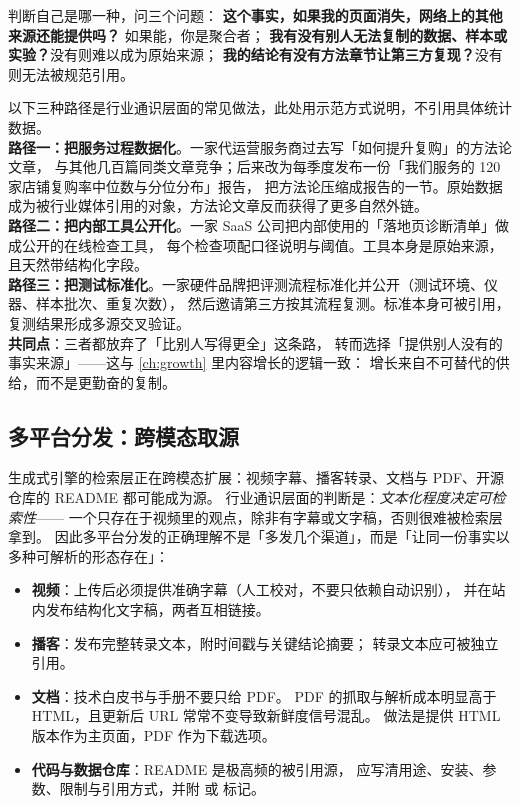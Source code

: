 判断自己是哪一种，问三个问题：
\textbf{这个事实，如果我的页面消失，网络上的其他来源还能提供吗？}
如果能，你是聚合者；
\textbf{我有没有别人无法复制的数据、样本或实验？}没有则难以成为原始来源；
\textbf{我的结论有没有方法章节让第三方复现？}没有则无法被规范引用。

\begin{casebox}[案例：从聚合者转为原始来源的三种路径（示范）]
以下三种路径是行业通识层面的常见做法，此处用示范方式说明，不引用具体统计数据。\\
\textbf{路径一：把服务过程数据化}。一家代运营服务商过去写「如何提升复购」的方法论文章，
与其他几百篇同类文章竞争；后来改为每季度发布一份「我们服务的 120 家店铺复购率中位数与分位分布」报告，
把方法论压缩成报告的一节。原始数据成为被行业媒体引用的对象，方法论文章反而获得了更多自然外链。\\
\textbf{路径二：把内部工具公开化}。一家 SaaS 公司把内部使用的「落地页诊断清单」做成公开的在线检查工具，
每个检查项配口径说明与阈值。工具本身是原始来源，且天然带结构化字段。\\
\textbf{路径三：把测试标准化}。一家硬件品牌把评测流程标准化并公开（测试环境、仪器、样本批次、重复次数），
然后邀请第三方按其流程复测。标准本身可被引用，复测结果形成多源交叉验证。\\
\textbf{共同点}：三者都放弃了「比别人写得更全」这条路，
转而选择「提供别人没有的事实来源」——这与 \cref{ch:growth} 里内容增长的逻辑一致：
增长来自不可替代的供给，而不是更勤奋的复制。
\end{casebox}

\subsection{多平台分发：跨模态取源}

生成式引擎的检索层正在跨模态扩展：视频字幕、播客转录、文档与 PDF、开源仓库的 README 都可能成为源。
行业通识层面的判断是：\emph{文本化程度决定可检索性}——
一个只存在于视频里的观点，除非有字幕或文字稿，否则很难被检索层拿到。
因此多平台分发的正确理解不是「多发几个渠道」，而是「让同一份事实以多种可解析的形态存在」：

\begin{itemize}
  \item \textbf{视频}：上传后必须提供准确字幕（人工校对，不要只依赖自动识别），
        并在站内发布结构化文字稿，两者互相链接。
  \item \textbf{播客}：发布完整转录文本，附时间戳与关键结论摘要；
        转录文本应可被独立引用。
  \item \textbf{文档}：技术白皮书与手册不要只给 PDF。
        PDF 的抓取与解析成本明显高于 HTML，且更新后 URL 常常不变导致新鲜度信号混乱。
        做法是提供 HTML 版本作为主页面，PDF 作为下载选项。
  \item \textbf{代码与数据仓库}：README 是极高频的被引用源，
        应写清用途、安装、参数、限制与引用方式，并附  或  标记。
\end{itemize}

